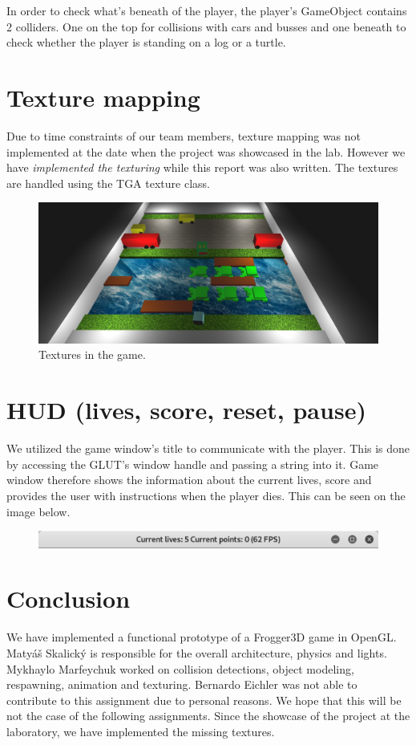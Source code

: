 \documentclass[a4paper,10pt]{article}
\begin{document}
In order to check what's beneath of the player, the player's GameObject contains 2 colliders. One on the top for collisions with cars and busses and one beneath to check whether the player is standing on a log or a turtle.

\section{Texture mapping}
Due to time constraints of our team members, texture mapping was not implemented at the date when the project was showcased in the lab. However we have \emph{implemented the texturing} while this report was also written. The textures are handled using the TGA texture class.
\begin{figure}[!htb]
	\centering
  	\includegraphics[width=0.85\linewidth]{images/textures.png}
  	\caption{Textures in the game.}
\end{figure}


\section{HUD (lives, score, reset, pause)}
We utilized the game window's title to communicate with the player. This is done by accessing the GLUT's window handle and passing a string into it. Game window therefore shows the information about the current lives, score and provides the user with instructions when the player dies. This can be seen on the image below.

\begin{figure}[!htb]
	\centering
  	\includegraphics[width=\linewidth]{images/image2.png}
\end{figure}


\section{Conclusion}
We have implemented a functional prototype of a Frogger3D game in OpenGL. Matyáš Skalický is responsible for the overall architecture, physics and lights. Mykhaylo Marfeychuk worked on collision detections, object modeling, respawning, animation and texturing. Bernardo Eichler was not able to contribute to this assignment due to personal reasons. We hope that this will be not the case of the following assignments. Since the showcase of the project at the laboratory, we have implemented the missing textures.
\end{document}
